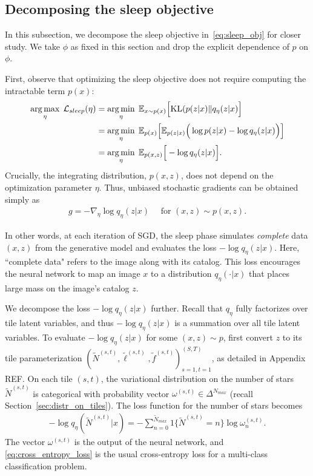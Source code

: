 \subsection{Decomposing the sleep objective}
\label{sec:sleep_details}
In this subsection, we decompose the sleep objective in~\eqref{eq:sleep_obj} for closer study.
We take $\phi$ as fixed in this section and drop the explicit dependence of $p$ on $\phi$.

First, observe that optimizing the sleep objective does not require computing the intractable term $p(x)$:
\begin{align}
\operatorname*{arg\,max}_\eta\; \mathcal{L}_{sleep}(\eta)
    & = \operatorname*{arg\,min}_{\eta} \; \mathbb{E}_{x \sim p(x)}\Big[ \mathrm{KL}(p(z | x) \| q_\eta(z | x)\Big] \\
  &=\operatorname*{arg\,min}_{\eta} \; \mathbb E_{p(x)}\Big[\mathbb E_{p(z | x)}\Big(\log p(z | x) - \log q_\eta(z | x) \Big)\Big]\\
&=\operatorname*{arg\,min}_{\eta} \; \mathbb E_{p(x, z)}\Big[- \log q_\eta(z | x) \Big]\label{eq:sleep_loss_simple}.
\end{align}
Crucially, the integrating distribution, $p(x,z)$, does not depend on the optimization parameter $\eta$.
Thus, unbiased stochastic gradients can be obtained simply as
\begin{align}
    g = -\nabla_\eta \log q_\eta(z | x) \quad \text{ for } (x, z)\sim p(x, z).
\end{align}

In other words, at each iteration of SGD, the sleep phase simulates {\itshape complete} data $(x,z)$ from the generative model and evaluates the loss $-\log q_\eta(z | x)$.
Here, ``complete data" refers to the image along with its catalog.
This loss encourages the neural network to map an image $x$ to a distribution $q_{\eta}(\cdot | x)$ that places large mass on the image's catalog $z$.

We decompose the loss $-\log q_\eta(z | x)$ further.
Recall that $q_\eta$ fully factorizes over tile latent variables, and thus $-\log q_\eta(z | x)$ is a summation over all tile latent variables.
To evaluate $-\log q_\eta(z | x)$ for some $(x,z)\sim p$, first convert $z$ to its tile parameterization $(\tilde N^{(s,t)}, \tilde \ell^{(s,t)}, \tilde f^{(s,t)})_{s=1,t=1}^{(S,T)}$, as detailed in Appendix REF.
On each tile $(s,t)$, the variational distribution on the number of stars $\tilde N^{(s,t)}$ is categorical with probability vector $\omega^{(s,t)}\in\Delta^{N_{max}}$ (recall Section~\ref{sec:distr_on_tiles}).
The loss function for the number of stars becomes
\begin{align}
    - \log q_\eta(\tilde N^{(s,t)} | x) = -\sum_{n = 0}^{\tilde N_{max}} 1\{\tilde N^{(s,t)} = n\} \log \omega^{(s,t)}_n.
    \label{eq:cross_entropy_loss}
\end{align}
The vector $\omega^{(s,t)}$ is the output of the neural network, and \eqref{eq:cross_entropy_loss} is the usual cross-entropy loss for a multi-class classification problem.

